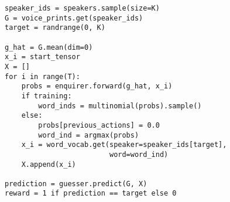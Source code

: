 \begin{lstlisting}[caption={Интерактивная игра для обучения \enquirer{}}]
speaker_ids = speakers.sample(size=K)
G = voice_prints.get(speaker_ids)
target = randrange(0, K)

g_hat = G.mean(dim=0)
x_i = start_tensor
X = []
for i in range(T):
    probs = enquirer.forward(g_hat, x_i)
    if training:
        word_inds = multinomial(probs).sample()
    else:
        probs[previous_actions] = 0.0
        word_ind = argmax(probs)
    x_i = word_vocab.get(speaker=speaker_ids[target],
                         word=word_ind)
    X.append(x_i)

prediction = guesser.predict(G, X)
reward = 1 if prediction == target else 0
\end{lstlisting}